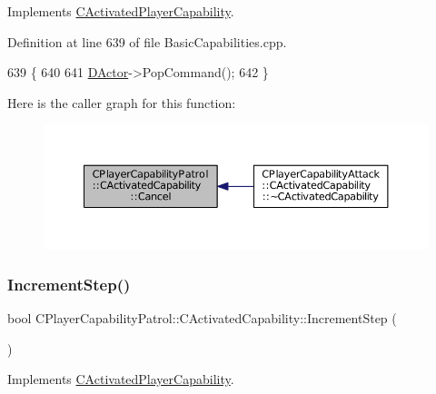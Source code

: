Implements \hyperlink{classCActivatedPlayerCapability_a5cde83be468e262ad054d81e28684a81}{C\+Activated\+Player\+Capability}.



Definition at line 639 of file Basic\+Capabilities.\+cpp.


\begin{DoxyCode}
639                                                         \{
640 
641     \hyperlink{classCActivatedPlayerCapability_a54ca944b47bff2718330639941d402b0}{DActor}->PopCommand();
642 \}
\end{DoxyCode}
Here is the caller graph for this function\+:\nopagebreak
\begin{figure}[H]
\begin{center}
\leavevmode
\includegraphics[width=350pt]{classCPlayerCapabilityPatrol_1_1CActivatedCapability_a36165c232eb283ce4a92bd4606480c73_icgraph}
\end{center}
\end{figure}
\hypertarget{classCPlayerCapabilityPatrol_1_1CActivatedCapability_a576a71646225c0723a0ed9e77add01fd}{}\label{classCPlayerCapabilityPatrol_1_1CActivatedCapability_a576a71646225c0723a0ed9e77add01fd} 
\subsubsection{\texorpdfstring{Increment\+Step()}{IncrementStep()}}
{\footnotesize\ttfamily bool C\+Player\+Capability\+Patrol\+::\+C\+Activated\+Capability\+::\+Increment\+Step (\begin{DoxyParamCaption}{ }\end{DoxyParamCaption})\hspace{0.3cm}{\ttfamily [virtual]}}



Implements \hyperlink{classCActivatedPlayerCapability_a943b5999a57504399293250382c0ec6a}{C\+Activated\+Player\+Capability}.




